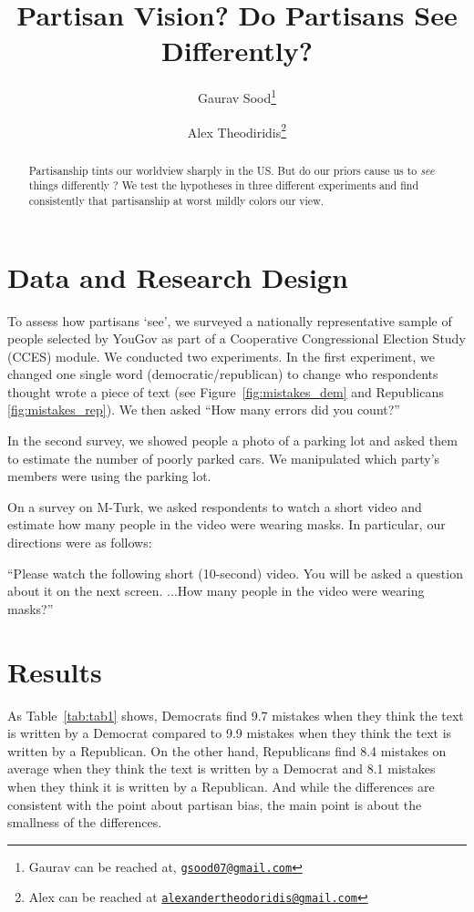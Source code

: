\documentclass[12pt, letterpaper]{article}
\title{Partisan Vision? Do Partisans See Differently?}
\author{Gaurav Sood\thanks{Gaurav can be reached at, \href{mailto:gsood07@gmail.com}{\texttt{gsood07@gmail.com}}} \and Alex Theodiridis\thanks{Alex can be reached at \href{alexandertheodoridis@gmail.com}{\texttt{alexandertheodoridis@gmail.com}}}}
\begin{document}
\maketitle
\thispagestyle{empty}

\begin{abstract}

\noindent Partisanship tints our worldview sharply in the US. But do our priors cause us to \textit{see} things differently \citep{chabris2010invisible}? We test the hypotheses in three different experiments and find consistently that partisanship at worst mildly colors our view.

\end{abstract}

\newpage


\doublespacing


\section{Data and Research Design}

\citep{chabris2010invisible}

To assess how partisans `see', we surveyed a nationally representative sample of people selected by YouGov \citep{rivers2007} as part of a Cooperative Congressional Election Study (CCES) module. We conducted two experiments. In the first experiment, we changed one single word (democratic/republican) to change who respondents thought wrote a piece of text (see Figure~\ref{fig:mistakes_dem} and Republicans \ref{fig:mistakes_rep}). We then asked ``How many errors did you count?''

In the second survey, we showed people a photo of a parking lot and asked them to estimate the number of poorly parked cars. We manipulated which party's members were using the parking lot. 

On a survey on M-Turk, we asked respondents to watch a short video and estimate how many people in the video were wearing masks. In particular, our directions were as follows:

``Please watch the following short (10-second) video. You will be asked a question about it on the next screen. ...How many people in the video were wearing masks?''

\section{Results}

As Table~\ref{tab:tab1} shows, Democrats find 9.7 mistakes when they think the text is written by a Democrat compared to 9.9 mistakes when they think the text is written by a Republican. On the other hand, Republicans find 8.4 mistakes on average when they think the text is written by a Democrat and 8.1 mistakes when they think it is written by a Republican. And while the differences are consistent with the point about partisan bias, the main point is about the smallness of the differences. 
\end{document}
